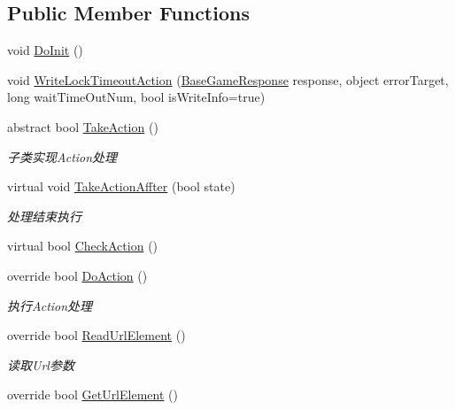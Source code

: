 \subsection*{Public Member Functions}
\begin{DoxyCompactItemize}
\item 
void \mbox{\hyperlink{class_t_net_1_1_service_1_1_base_struct_a5f4612defb16558fdaa7c0adaa8555d1}{Do\+Init}} ()
\item 
void \mbox{\hyperlink{class_t_net_1_1_service_1_1_base_struct_a0773bbf960ad91ff35e47508ee8c903b}{Write\+Lock\+Timeout\+Action}} (\mbox{\hyperlink{class_t_net_1_1_service_1_1_base_game_response}{Base\+Game\+Response}} response, object error\+Target, long wait\+Time\+Out\+Num, bool is\+Write\+Info=true)
\item 
abstract bool \mbox{\hyperlink{class_t_net_1_1_service_1_1_base_struct_a5a1250b74d925d42066aebdefa36f54a}{Take\+Action}} ()
\begin{DoxyCompactList}\small\item\em 子类实现\+Action处理 \end{DoxyCompactList}\item 
virtual void \mbox{\hyperlink{class_t_net_1_1_service_1_1_base_struct_ab81857764a905fac984798e4fd2e2323}{Take\+Action\+Affter}} (bool state)
\begin{DoxyCompactList}\small\item\em 处理结束执行 \end{DoxyCompactList}\item 
virtual bool \mbox{\hyperlink{class_t_net_1_1_service_1_1_base_struct_a1e1ae8e1d5e424c6d1858d375bc9e61d}{Check\+Action}} ()
\item 
override bool \mbox{\hyperlink{class_t_net_1_1_service_1_1_base_struct_ad55cbb354a9de58eb1c2d0608a7e21f2}{Do\+Action}} ()
\begin{DoxyCompactList}\small\item\em 执行\+Action处理 \end{DoxyCompactList}\item 
override bool \mbox{\hyperlink{class_t_net_1_1_service_1_1_base_struct_afa4a4e036ed31b2f0d2eba3b2ed8a99c}{Read\+Url\+Element}} ()
\begin{DoxyCompactList}\small\item\em 读取\+Url参数 \end{DoxyCompactList}\item 
override bool \mbox{\hyperlink{class_t_net_1_1_service_1_1_base_struct_a21e7b48b27540f2b155cd9aa0eb7fb10}{Get\+Url\+Element}} ()

\end{DoxyCompactItemize}
